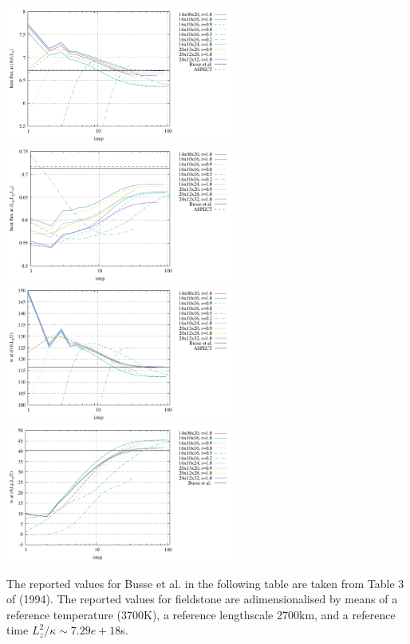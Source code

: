 \begin{center}
\includegraphics[width=7.5cm]{python_codes/fieldstone_20/results/hf1.pdf}
\includegraphics[width=7.5cm]{python_codes/fieldstone_20/results/hf2.pdf}\\
\includegraphics[width=7.5cm]{python_codes/fieldstone_20/results/wmid1.pdf}
\includegraphics[width=7.5cm]{python_codes/fieldstone_20/results/wmid2.pdf}
\end{center}

\newpage
The reported values for Busse et al. in the following table are taken from Table 3 
of \textcite{bucc94} (1994).
The reported values for fieldstone are adimensionalised by means of a reference temperature (3700K),
a reference lengthscale 2700km, and a reference time $L_z^2/\kappa\sim 7.29e+18$s.


